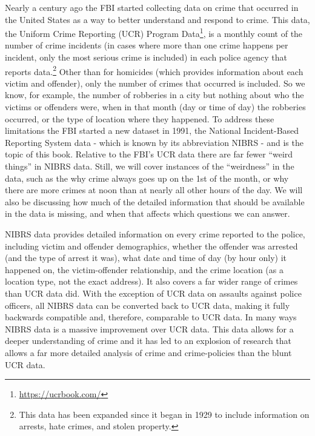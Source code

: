 \documentclass[
]{krantz}
\renewcommand{\href}[2]{#2\footnote{\url{#1}}}
\begin{document}
Nearly a century ago the FBI started collecting data on
crime that occurred in the United States as a way to better
understand and respond to crime. This data, the
\href{https://ucrbook.com/}{Uniform Crime Reporting (UCR)
Program Data}, is a monthly count of the number of crime
incidents (in cases where more than one crime happens per
incident, only the most serious crime is included) in each
police agency that reports data.\footnote{This data has been
  expanded since it began in 1929 to include information on
  arrests, hate crimes, and stolen property.} Other than for
homicides (which provides information about each victim and
offender), only the number of crimes that occurred is
included. So we know, for example, the number of robberies
in a city but nothing about who the victims or offenders
were, when in that month (day or time of day) the robberies
occurred, or the type of location where they happened. To
address these limitations the FBI started a new dataset in
1991, the National Incident-Based Reporting System data -
which is known by its abbreviation NIBRS - and is the topic
of this book. Relative to the FBI's UCR data there are far
fewer ``weird things'' in NIBRS data. Still, we will cover
instances of the ``weirdness'' in the data, such as the why
crime always goes up on the 1st of the month, or why there
are more crimes at noon than at nearly all other hours of
the day. We will also be discussing how much of the detailed
information that should be available in the data is missing,
and when that affects which questions we can answer.

NIBRS data provides detailed information on every crime
reported to the police, including victim and offender
demographics, whether the offender was arrested (and the
type of arrest it was), what date and time of day (by hour
only) it happened on, the victim-offender relationship, and
the crime location (as a location type, not the exact
address). It also covers a far wider range of crimes than
UCR data did. With the exception of UCR data on assaults
against police officers, all NIBRS data can be converted
back to UCR data, making it fully backwards compatible and,
therefore, comparable to UCR data. In many ways NIBRS data
is a massive improvement over UCR data. This data allows for
a deeper understanding of crime and it has led to an
explosion of research that allows a far more detailed
analysis of crime and crime-policies than the blunt UCR
data.
\end{document}
